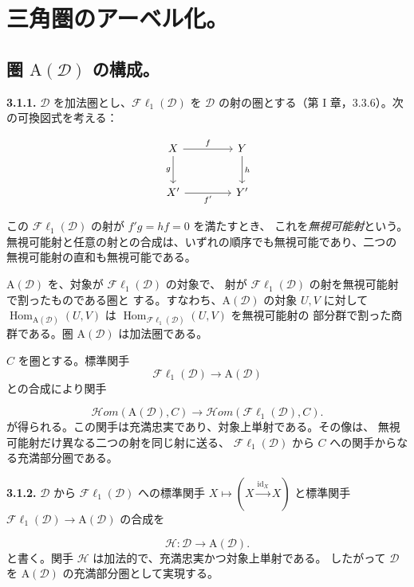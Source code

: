 \clearpage
{}%
\begingroup
\small
\setlength{\parskip}{0pt}%
\setlength{\emergencystretch}{1.5em}%

\section{三角圏のアーベル化。}

\subsection{圏 \texorpdfstring{$\mathrm A(\mathcal D)$}{A(D)} の構成。}

\noindent\textbf{3.1.1.}\quad
$\mathcal D$ を加法圏とし、$\mathcal{F}\ell_1(\mathcal D)$ を
$\mathcal D$ の射の圏とする（第 I 章，3.3.6）。次の可換図式を考える：

\[
\begin{tikzcd}[column sep=4.2em,row sep=2.5em]
X \arrow[r,"f"] \arrow[d,"g"'] & Y \arrow[d,"h"] \\
X' \arrow[r,"f'"'] & Y'
\end{tikzcd}
\]

\noindent この $\mathcal{F}\ell_1(\mathcal D)$ の射が
$f'g=hf=0$ を満たすとき、
これを\emph{無視可能射}という。
無視可能射と任意の射との合成は、いずれの順序でも無視可能であり、二つの
無視可能射の直和も無視可能である。

$\mathrm A(\mathcal D)$ を、対象が $\mathcal{F}\ell_1(\mathcal D)$ の対象で、
射が $\mathcal{F}\ell_1(\mathcal D)$ の射を無視可能射で割ったものである圏と
する。すなわち、$\mathrm A(\mathcal D)$ の対象 $U,V$ に対して
$\operatorname{Hom}_{\mathrm A(\mathcal D)}(U,V)$ は
$\operatorname{Hom}_{\mathcal{F}\ell_1(\mathcal D)}(U,V)$ を無視可能射の
部分群で割った商群である。圏 $\mathrm A(\mathcal D)$ は加法圏である。

$C$ を圏とする。標準関手
\[
\mathcal{F}\ell_1(\mathcal D)\longrightarrow\mathrm A(\mathcal D)
\]
との合成により関手

\[
\mathcal H\!om(\mathrm A(\mathcal D),C)
\longrightarrow
\mathcal H\!om(\mathcal{F}\ell_1(\mathcal D),C).
\tag{3.1.1.1}
\]
が得られる。この関手は充満忠実であり、対象上単射である。その像は、
無視可能射だけ異なる二つの射を同じ射に送る、
$\mathcal{F}\ell_1(\mathcal D)$ から $C$ への関手からなる充満部分圏である。

\medskip
\noindent\textbf{3.1.2.}\quad
$\mathcal D$ から $\mathcal{F}\ell_1(\mathcal D)$ への標準関手
$X\longmapsto(X\xrightarrow{\operatorname{id}_X}X)$ と標準関手
$\mathcal{F}\ell_1(\mathcal D)\longrightarrow\mathrm A(\mathcal D)$ の合成を

\[
\mathcal H\colon\mathcal D\longrightarrow\mathrm A(\mathcal D).
\tag{3.1.2.1}
\]
と書く。関手 $\mathcal H$ は加法的で、充満忠実かつ対象上単射である。
したがって $\mathcal D$ を $\mathrm A(\mathcal D)$ の充満部分圏として実現する。
\endgroup
